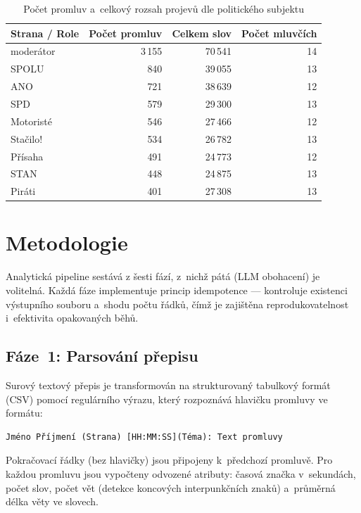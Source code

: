 \documentclass[12pt, a4paper]{article}
\begin{document}
\begin{table}[H]
  \centering
  \caption{Počet promluv a~celkový rozsah projevů dle politického subjektu}
  \label{tab:parties}
  \begin{tabular}{lrrr}
    \toprule
    \textbf{Strana / Role} & \textbf{Počet promluv} & \textbf{Celkem slov}
      & \textbf{Počet mluvčích} \\
    \midrule
    moderátor  & 3\,155 & 70\,541 & 14 \\
    SPOLU      & 840    & 39\,055 & 13 \\
    ANO        & 721    & 38\,639 & 12 \\
    SPD        & 579    & 29\,300 & 13 \\
    Motoristé  & 546    & 27\,466 & 12 \\
    Stačilo!   & 534    & 26\,782 & 13 \\
    Přísaha    & 491    & 24\,773 & 12 \\
    STAN       & 448    & 24\,875 & 13 \\
    Piráti     & 401    & 27\,308 & 13 \\
    \bottomrule
  \end{tabular}
\end{table}

\section{Metodologie}
\label{sec:metodologie}

Analytická pipeline sestává z šesti fází, z~nichž pátá (LLM obohacení)
je volitelná. Každá fáze implementuje princip idempotence — kontroluje
existenci výstupního souboru a~shodu počtu řádků, čímž je zajištěna
reprodukovatelnost i~efektivita opakovaných běhů.

\subsection{Fáze~1: Parsování přepisu}
\label{sec:parsing}

Surový textový přepis je transformován na strukturovaný tabulkový formát
(CSV) pomocí regulárního výrazu, který rozpoznává hlavičku promluvy ve
formátu:

\begin{verbatim}
Jméno Příjmení (Strana) [HH:MM:SS](Téma): Text promluvy
\end{verbatim}

Pokračovací řádky (bez hlavičky) jsou připojeny k~předchozí promluvě.
Pro každou promluvu jsou vypočteny odvozené atributy: časová značka
v~sekundách, počet slov, počet vět (detekce koncových interpunkčních znaků)
a~průměrná délka věty ve slovech.
\end{document}
